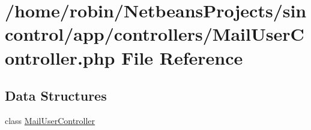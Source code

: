 \hypertarget{_mail_user_controller_8php}{}\section{/home/robin/\+Netbeans\+Projects/sincontrol/app/controllers/\+Mail\+User\+Controller.php File Reference}
\label{_mail_user_controller_8php}
\subsection*{Data Structures}
\begin{DoxyCompactItemize}
\item 
class \hyperlink{class_mail_user_controller}{Mail\+User\+Controller}
\end{DoxyCompactItemize}
